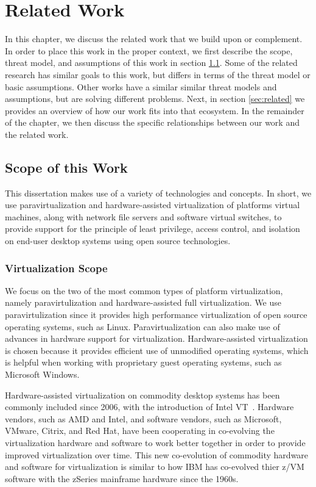 
\chapter{Related Work}

In this chapter, we discuss the related work that we build upon or complement. In order to place this work in the proper context, we first describe the scope, threat model, and assumptions of this work in section \ref{sec:scope}. Some of the related research has similar goals to this work, but differs in terms of the threat model or basic assumptions. Other works have a similar similar threat models and assumptions, but are solving different problems. Next,  in section \ref{sec:related} we provides an overview of how our work fits into that ecosystem. In the remainder of the chapter, we then discuss the specific relationships between our work and the related work.

\section{Scope of this Work}
\label{sec:scope}

This dissertation makes use of a variety of technologies and concepts. In short, we use paravirtualization and hardware-assisted virtualization of platforms virtual machines, along with network file servers and software virtual switches, to provide support for the principle of least privilege, access control, and isolation on end-user desktop systems using open source technologies.

\subsection{Virtualization Scope}

We focus on the two of the most common types of platform virtualization, namely paravirtulization and hardware-assisted full virtualization. We use paravirtulization since it provides high performance virtualization of open source operating systems, such as Linux. Paravirtualization can also make use of advances in hardware support for virtualization. Hardware-assisted virtualization is chosen because it provides efficient use of unmodified operating systems, which is helpful when working with proprietary guest operating systems, such as Microsoft Windows.

Hardware-assisted virtualization on commodity desktop systems has been commonly included since 2006, with the introduction of Intel VT~\cite{van_Doorn_2006}. Hardware vendors, such as AMD and Intel, and software vendors, such as Microsoft, VMware, Citrix, and Red Hat, have been cooperating in co-evolving the virtualization hardware and software to work better together in order to provide improved virtualization over time. This new co-evolution of commodity hardware and software for virtualization is similar to how IBM has co-evolved thier z/VM software with the zSeries mainframe hardware since the 1960s.

